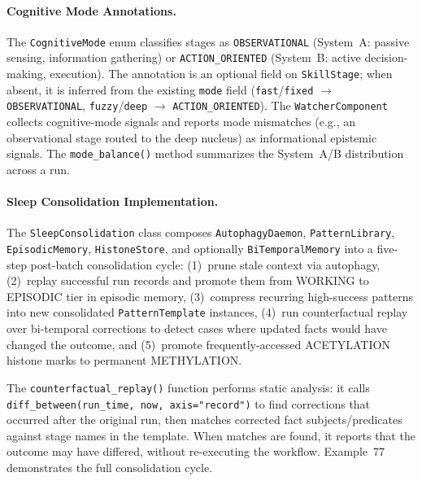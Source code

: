 \paragraph{Cognitive Mode Annotations.}
\label{sec:cognitive-modes-impl}
The \texttt{CognitiveMode} enum classifies stages as \texttt{OBSERVATIONAL} (System~A: passive sensing, information gathering) or \texttt{ACTION\_ORIENTED} (System~B: active decision-making, execution). The annotation is an optional field on \texttt{SkillStage}; when absent, it is inferred from the existing \texttt{mode} field (\texttt{fast}/\texttt{fixed} $\to$ \texttt{OBSERVATIONAL}, \texttt{fuzzy}/\texttt{deep} $\to$ \texttt{ACTION\_ORIENTED}). The \texttt{WatcherComponent} collects cognitive-mode signals and reports mode mismatches (e.g., an observational stage routed to the deep nucleus) as informational epistemic signals. The \texttt{mode\_balance()} method summarizes the System~A/B distribution across a run.

\paragraph{Sleep Consolidation Implementation.}
\label{sec:consolidation-impl}
The \texttt{SleepConsolidation} class composes \texttt{AutophagyDaemon}, \allowbreak \texttt{PatternLibrary}, \allowbreak \texttt{EpisodicMemory}, \allowbreak \texttt{HistoneStore}, and optionally \texttt{BiTemporalMemory} into a five-step post-batch consolidation cycle: (1)~prune stale context via autophagy, (2)~replay successful run records and promote them from WORKING to EPISODIC tier in episodic memory, (3)~compress recurring high-success patterns into new consolidated \texttt{PatternTemplate} instances, (4)~run counterfactual replay over bi-temporal corrections to detect cases where updated facts would have changed the outcome, and (5)~promote frequently-accessed ACETYLATION histone marks to permanent METHYLATION.

The \texttt{counterfactual\_replay()} function performs static analysis: it calls \texttt{diff\_between}\allowbreak\texttt{(run\_time, now, axis="record")} to find corrections that occurred after the original run, then matches corrected fact subjects/predicates against stage names in the template. When matches are found, it reports that the outcome may have differed, without re-executing the workflow. Example~77 demonstrates the full consolidation cycle.

